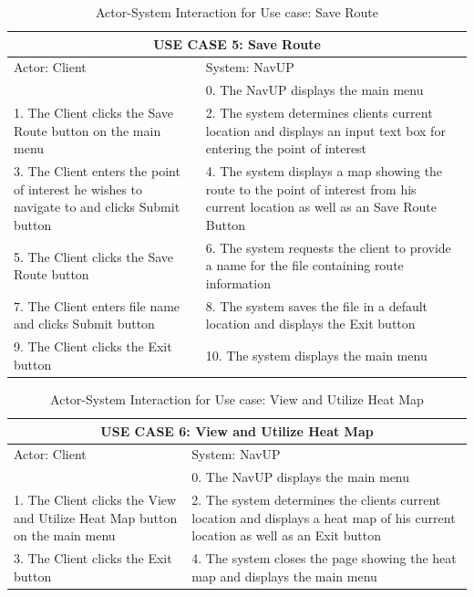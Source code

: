 \documentclass[a4paper,10pt]{article}
\begin{document}
\begin{enumerate}
\begin{table}[h!]
\centering
\begin {tabular}{ |p{6cm}||p{6cm}|}
\hline
\multicolumn{2}{|c|}{USE CASE 5: Save Route }\\
\hline
Actor: Client&System: NavUP\\
\hline
&0. The NavUP displays the main menu\\
1. The Client clicks the Save Route button on the main menu &2. The system determines clients current location and displays an input text box for entering the point of interest\\
3. The Client enters the point of interest he wishes to navigate to and clicks Submit button &4. The system displays a map showing the route to the point of interest from his current location as well as an Save Route Button\\
5. The Client clicks the Save Route button &6. The system requests the client to provide a name for the file containing route information\\
7. The Client enters file name and clicks Submit button &8. The system saves the file in a default location and displays the Exit button\\
9. The Client clicks the Exit button &10. The system displays the main menu\\
\hline
\end {tabular}
\caption{Actor-System Interaction for Use case:  Save Route} 
\end {table}

\begin{table}[h!]
\centering
\begin {tabular}{ |p{6cm}||p{6cm}|}
\hline
\multicolumn{2}{|c|}{USE CASE 6: View and Utilize Heat Map }\\
\hline
Actor: Client&System: NavUP\\
\hline
&0. The NavUP displays the main menu\\
1. The Client clicks the View and Utilize Heat Map button on the main menu &2. The system determines the clients current location and displays a heat map of his current location as well as an Exit button\\
3. The Client clicks the Exit button &4. The system closes the page showing the heat map and displays the main menu\\
\hline
\end {tabular}
\caption{Actor-System Interaction for Use case: View and Utilize Heat Map} 
\end {table}



\end{enumerate} 
\end{document}
